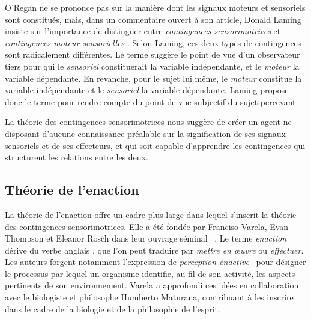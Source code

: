 O'Regan ne se prononce pas sur la manière dont les signaux moteurs et sensoriels sont constitués, mais, dans un commentaire ouvert à son article, Donald Laming  insiste sur l'importance de distinguer entre \emph{contingences sensorimotrices} et \emph{contingences moteur-sensorielles} \cite{laming_distinction_2001}. 
Selon Laming, ces deux  types de contingences sont radicalement différentes. 
Le terme  suggère le point de vue d'un observateur tiers pour qui le \emph{sensoriel} constituerait la variable indépendante, et le \emph{moteur} la variable dépendante. 
En revanche, pour le sujet lui même, le \emph{moteur} constitue la variable indépendante et le \emph{sensoriel} la variable dépendante. 
Laming propose donc le terme  pour rendre compte du point de vue subjectif du sujet percevant. 

La théorie des contingences sensorimotrices nous suggère de créer un agent ne disposant d'aucune connaissance préalable sur la signification de ses signaux sensoriels et de ses effecteurs, et qui soit capable d'apprendre les contingences qui structurent les relations entre les deux. 


\subsection{Théorie de l'enaction}
\label{sec:enaction}

\noindent
La théorie de l'enaction offre un cadre plus large dans lequel s'inscrit la théorie des contingences sensorimotrices.
Elle a été fondée par Franciso Varela, Evan Thompson et Eleanor Rosch dans leur ouvrage séminal \og {} \fg\ \cite{varela_embodied_1993}. 
Le terme \emph{enaction} dérive du verbe anglais , que l'on peut traduire par \emph{mettre en \oe uvre} ou \emph{effectuer}.
Les auteurs forgent notamment l'expression de \og \emph{perception énactive} \fg\ pour désigner le processus par lequel un organisme identifie, au fil de son activité, les aspects pertinents de son environnement. 
Varela a approfondi ces idées en collaboration avec le biologiste et philosophe Humberto Maturana, contribuant à les inscrire dans le cadre de la biologie et de la philosophie de l'esprit. 

